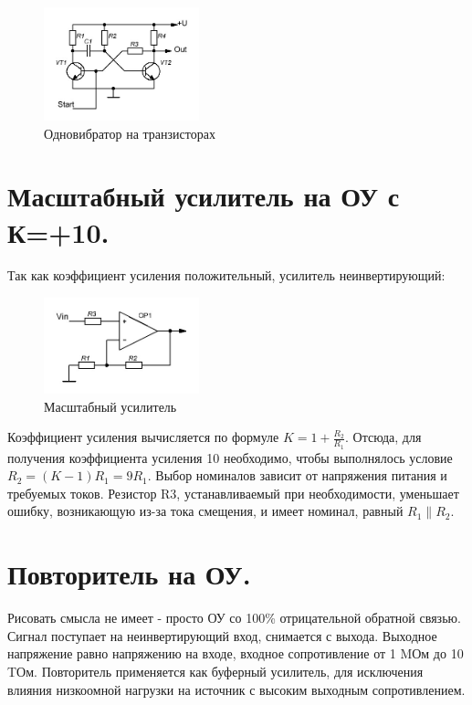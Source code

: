 \documentclass[unicode, 12pt, a4paper, oneside]{article}
\begin{document}
\begin{figure}[H]
\centering
\includegraphics[width=0.4\textwidth]{142.jpg}
\caption{Одновибратор на транзисторах}
\end{figure}

\section{Масштабный усилитель на ОУ с К=+10.}

Так как коэффициент усиления положительный, усилитель неинвертирующий:
\begin{figure}[H]
\centering
\includegraphics[width=0.4\textwidth]{143.jpg}
\caption{Масштабный усилитель}
\end{figure}
Коэффициент усиления вычисляется по формуле $K = 1 + \frac{R_2}{R_1} $. Отсюда, для получения коэффициента усиления 10 необходимо, чтобы выполнялось условие $R_2 = (K - 1) R_1 = 9 R_1$. Выбор номиналов зависит от напряжения питания и требуемых токов. Резистор R3, устанавливаемый при необходимости, уменьшает ошибку, возникающую из-за тока смещения, и имеет номинал, равный $R_1 \parallel R_2$.

\section{Повторитель на ОУ.}
Рисовать смысла не имеет - просто ОУ со 100\% отрицательной обратной связью. Сигнал поступает на неинвертирующий вход, снимается с выхода. Выходное напряжение равно напряжению на входе, входное сопротивление от 1 MОм до 10 TОм. Повторитель применяется как буферный усилитель, для исключения влияния низкоомной нагрузки на источник с высоким выходным сопротивлением.
\end{document}
